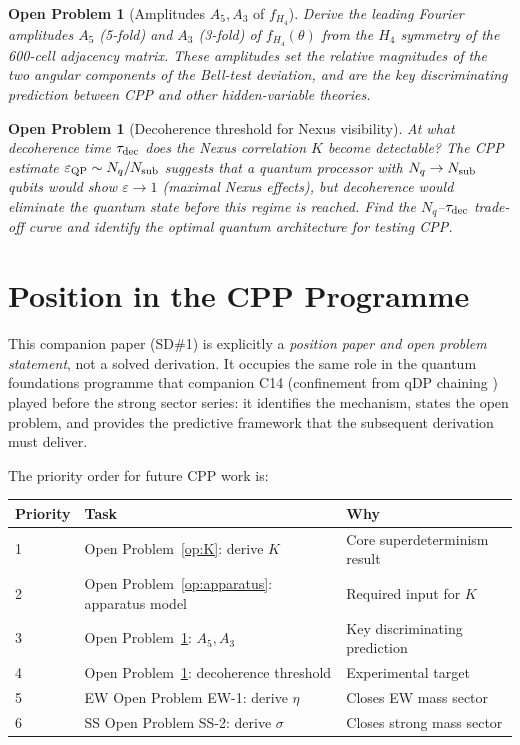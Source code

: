 \documentclass[11pt,a4paper]{article}
\newtheorem{openprob}[theorem]{Open Problem}
\newcommand{\eps}{\varepsilon}
\begin{document}
\begin{openprob}[Amplitudes $A_5, A_3$ of $f_{H_4}$]
\label{op:amplitudes}
Derive the leading Fourier amplitudes $A_5$ (5-fold) and $A_3$
(3-fold) of $f_{H_4}(\theta)$ from the $H_4$ symmetry of the
600-cell adjacency matrix.  These amplitudes set the relative
magnitudes of the two angular components of the Bell-test deviation,
and are the key discriminating prediction between CPP and other
hidden-variable theories.
\end{openprob}

\begin{openprob}[Decoherence threshold for Nexus visibility]
\label{op:decoherence}
At what decoherence time $\tau_{\rm dec}$ does the Nexus
correlation $K$ become detectable?  The CPP estimate $\eps_{\rm QP}
\sim N_q / N_{\rm sub}$ suggests that a quantum processor with
$N_q \to N_{\rm sub}$ qubits would show $\eps \to 1$ (maximal Nexus
effects), but decoherence would eliminate the quantum state before
this regime is reached.  Find the $N_q$--$\tau_{\rm dec}$ trade-off
curve and identify the optimal quantum architecture for testing
CPP.
\end{openprob}

\section{Position in the CPP Programme}

This companion paper (SD\#1) is explicitly a \emph{position paper and
open problem statement}, not a solved derivation.  It occupies the
same role in the quantum foundations programme that companion C14
(confinement from qDP chaining \citep{c14}) played before the strong
sector series: it identifies the mechanism, states the open problem,
and provides the predictive framework that the subsequent derivation
must deliver.

The priority order for future CPP work is:

\begin{center}
\begin{tabular}{@{}lll@{}}
\toprule
Priority & Task & Why \\
\midrule
1 & Open Problem~\ref{op:K}: derive $K$ & Core superdeterminism result \\
2 & Open Problem~\ref{op:apparatus}: apparatus model & Required input for $K$ \\
3 & Open Problem~\ref{op:amplitudes}: $A_5, A_3$ & Key discriminating prediction \\
4 & Open Problem~\ref{op:decoherence}: decoherence threshold & Experimental target \\
5 & EW Open Problem EW-1: derive $\eta$ & Closes EW mass sector \\
6 & SS Open Problem SS-2: derive $\sigma$ & Closes strong mass sector \\
\bottomrule
\end{tabular}
\end{center}
\end{document}
